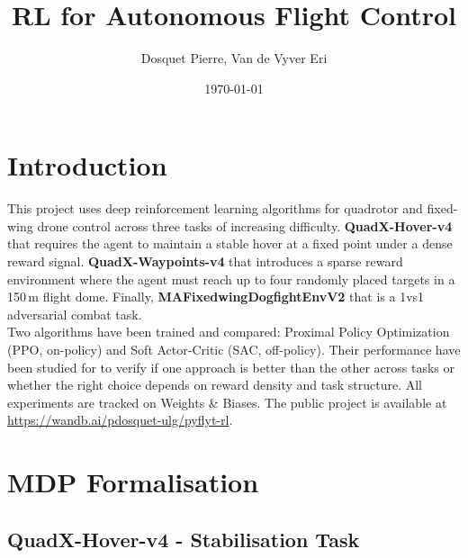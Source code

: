 \documentclass[11pt,a4paper]{article}
\title{RL for Autonomous Flight Control}
\author{Dosquet Pierre, Van de Vyver Eri}
\date{\today}
\begin{document}
\maketitle

\setcounter{section}{-1}

\section{Introduction}

This project uses deep reinforcement learning algorithms for quadrotor and fixed-wing
drone control across three tasks of increasing difficulty. \textbf{QuadX-Hover-v4} that
requires the agent to maintain a stable hover at a fixed point under a dense reward
signal. \textbf{QuadX-Waypoints-v4} that introduces a sparse reward environment where
the agent must reach up to four randomly placed targets in a 150\,m flight dome. Finally, 
\textbf{MAFixedwingDogfightEnvV2} that is a 1vs1 adversarial combat task. \\

Two algorithms have been trained and compared: Proximal Policy Optimization (PPO, on-policy) and Soft
Actor-Critic (SAC, off-policy). Their performance have been studied for to verify if one approach
is better than the other across tasks or whether the right choice depends on reward
density and task structure. All experiments are tracked on Weights \& Biases. The
public project is available at
\url{https://wandb.ai/pdosquet-ulg/pyflyt-rl}.

\section{MDP Formalisation}

\subsection{QuadX-Hover-v4 - Stabilisation Task}
\end{document}

